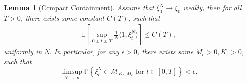 \documentclass[12pt]{article}
\newtheorem{lemma}[theorem]{Lemma}
\newcommand{\IE}{\mathbb E}
\begin{document}
\begin{lemma}[Compact Containment]
    \label{lem:lp_compact_containment}
Assume that $\xi^{N}_0 \to \xi_0$ weakly,
then for all $T>0$, there exists some constant $C(T)$,
such that
    \begin{align}
        \label{eqn:lp_mass_bound}
        \IE\left[
            \sup_{0 \le t \le T}
            \frac{1}{N}\langle 1, \xi^{N}_t \rangle
        \right]
        \le C(T) ,
    \end{align}
uniformly in $N$.
In particular, for any $\epsilon > 0$, there exists some $M_{\epsilon}>0, K_{\epsilon}>0$,
such that 
\begin{equation}
\limsup_{N \to \infty}
    \mathbb{P}\left\{ \xi^{N}_t \in \mathcal{M}_{K_{\epsilon},M_{\epsilon}}
        \text{ for } t\in [0,T] \right\}
        < \epsilon.
\end{equation}
\end{lemma}
\end{document}
